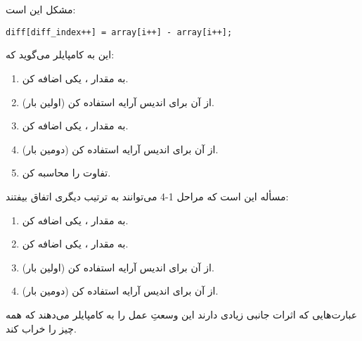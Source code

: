\section{}
\paragraph{}\label{answer:26}
مشکل این است:
\begin{LTR}
    \begin{lstlisting}[style=C++Style]
        diff[diff_index++] = array[i++] - array[i++];
    \end{lstlisting}
\end{LTR}

این به کامپایلر می‌گوید که:
\begin{enumerate}
    \item به مقدار ، یکی اضافه کن.
    \item از آن برای اندیس آرایه استفاده کن (اولین بار).
    \item به مقدار ، یکی اضافه کن.
    \item از آن برای اندیس آرایه استفاده کن (دومین بار).
    \item تفاوت را محاسبه کن.
\end{enumerate}

مسأله این است که مراحل 1-4 می‌توانند به ترتیب دیگری اتفاق بیفتند:
\begin{enumerate}
    \item به مقدار ، یکی اضافه کن.
    \item به مقدار ، یکی اضافه کن.
    \item از آن برای اندیس آرایه استفاده کن (اولین بار).
    \item از آن برای اندیس آرایه استفاده کن (دومین بار).
\end{enumerate}

عبارت‌هایی که اثرات جانبی زیادی دارند این وسعتِ عمل را به کامپایلر  می‌دهند که همه چیز را خراب کند.